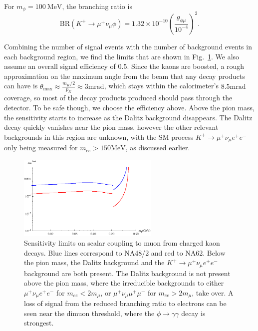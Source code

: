 \noindent For $m_\phi = 100~\textrm{MeV}$, the branching ratio is
\begin{equation}
    \textrm{BR}(K^+ \rightarrow \mu^+ \nu_\mu \phi) = 1.32\times 10^{-10} \left(\frac{g_{\phi\mu}}{10^{-4}}\right)^2\textrm{.}
\end{equation}

Combining the number of signal events with the number of background events in each background region, we find the limits that are shown in Fig.~\ref{fig:kaon_limits}.
We also assume an overall signal efficiency of $0.5$.
Since the kaons are boosted, a rough approximation on the maximum angle from the beam that any decay products can have is $\theta_\textrm{max} \approx \frac{m_K/2}{p_K} \approx 3\textrm{mrad}$, which stays within the calorimeter's $8.5\textrm{mrad}$ coverage, so most of the decay products produced should pass through the detector.
To be safe though, we choose the efficiency above.
Above the pion mass, the sensitivity starts to increase as the Dalitz background disappears.
The Dalitz decay quickly vanishes near the pion mass, however the other relevant backgrounds in this region are unknown, with the SM process $K^+ \rightarrow \mu^+ \nu_\mu e^+ e^-$ only being measured for $m_{ee} > 150\textrm{MeV}$, as discussed earlier.

\begin{figure}[h]
    \centering
    \includegraphics[width=0.6\textwidth]{Figures/limits/kaon_all}
    \caption[Sensitivity limits on scalar coupling to muon from charged kaon decay.]{Sensitivity limits on scalar coupling to muon from charged kaon decays. Blue lines correspond to NA48/2 and red to NA62. Below the pion mass, the Dalitz background and the $K^+ \rightarrow \mu^+ \nu_\mu e^+ e^-$ background are both present. The Dalitz background is not present above the pion mass, where the irreducible backgrounds to either $\mu^+ \nu_\mu e^+ e^-$ for $m_{ee} < 2m_\mu$, or $\mu^+ \nu_\mu \mu^+ \mu^-$ for $m_{ee} > 2m_\mu$, take over. A loss of signal from the reduced branching ratio to electrons can be seen near the dimuon threshold, where the $\phi \rightarrow \gamma \gamma$ decay is strongest.}
    \label{fig:kaon_limits}
\end{figure}
